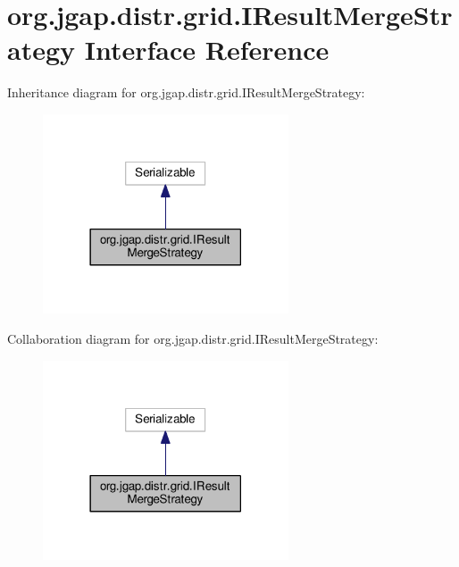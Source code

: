 \hypertarget{interfaceorg_1_1jgap_1_1distr_1_1grid_1_1_i_result_merge_strategy}{\section{org.\-jgap.\-distr.\-grid.\-I\-Result\-Merge\-Strategy Interface Reference}
\label{interfaceorg_1_1jgap_1_1distr_1_1grid_1_1_i_result_merge_strategy}
}


Inheritance diagram for org.\-jgap.\-distr.\-grid.\-I\-Result\-Merge\-Strategy\-:
\nopagebreak
\begin{figure}[H]
\begin{center}
\leavevmode
\includegraphics[width=206pt]{interfaceorg_1_1jgap_1_1distr_1_1grid_1_1_i_result_merge_strategy__inherit__graph}
\end{center}
\end{figure}


Collaboration diagram for org.\-jgap.\-distr.\-grid.\-I\-Result\-Merge\-Strategy\-:
\nopagebreak
\begin{figure}[H]
\begin{center}
\leavevmode
\includegraphics[width=206pt]{interfaceorg_1_1jgap_1_1distr_1_1grid_1_1_i_result_merge_strategy__coll__graph}
\end{center}
\end{figure}
